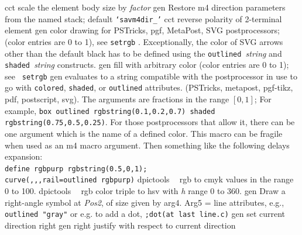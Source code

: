 %
  {cct}%
  {scale the element body size by {\sl factor}}%
%
  {gen}%
  {Restore m4 direction parameters from the named stack;
    default {\tt `savm4dir\_'}}%
%
  {cct}%
  {reverse polarity of 2-terminal element}%
%
  {gen}%
  {color drawing for PSTricks, pgf, MetaPost, SVG postprocessors;
   (color entries are 0 to 1),
   see {\tt setrgb} .  Exceptionally, the color
   of SVG arrows other than the default black has to be defined using the
   {\tt outlined }{\sl string} and {\tt shaded }{\sl string} constructs.}%
%
  {gen}%
  {fill with arbitrary color (color entries are 0 to 1); see {\tt
   setrgb}}%
%
  {gen}%
  {evaluates to a string compatible with the postprocessor in use
   to go with {\tt colored}, {\tt shaded}, or {\tt outlined} attributes.
   (PSTricks, metapost, pgf-tikz, pdf, postscript, svg).  The arguments
   are fractions in the range $[0,1]$; For example, {\tt box outlined
   rgbstring(0.1,0.2,0.7) shaded rgbstring(0.75,0.5,0.25)}.  For those
   postprocessors that allow it, there can be one argument which is the
   name of a defined color.
   This macro can be fragile when used as an m4 macro argument.
   Then something like the following delays expansion:\\
   {\tt define rgbpurp \lbr{}rgbstring(0.5,0,1)\rbr;}\\
   {\tt curve(,{,},rail=outlined rgbpurp)} }%
%
  {dpictools}%
  {$\;\;$ rgb to cmyk values in the range 0 to 100.}%
%
  {dpictools}%
  {$\;\;$ rgb color triple to hsv with {\sl h} range 0 to 360.}%
%
  {gen}%
  {Draw a right-angle symbol at {\sl Pos2}, of size given by arg4.
   Arg5 = line attributes, e.g., {\tt outlined "gray"} or e.g. to add a dot,
    {\tt ;dot(at last line.c)}}%
%
  {gen}%
  {set current direction right }%
%
  {gen}%
  {right justify with respect to current direction}%
%
